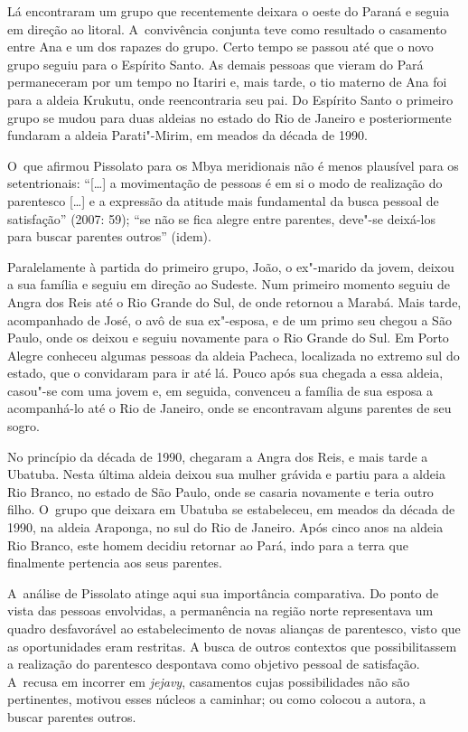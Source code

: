 Lá encontraram um grupo que recentemente deixara o oeste do Paraná e
seguia em direção ao litoral. A~convivência conjunta teve como
resultado o casamento entre Ana e um dos rapazes do grupo. Certo tempo
se passou até que o novo grupo seguiu para o Espírito Santo. As demais
pessoas que vieram do Pará permaneceram por um tempo no Itariri e, mais
tarde, o tio materno de Ana foi para a aldeia Krukutu, onde
reencontraria seu pai. Do Espírito Santo o primeiro grupo se mudou para
duas aldeias no estado do Rio de Janeiro e posteriormente fundaram a
aldeia Parati"-Mirim, em meados da década de 1990.

O~que afirmou Pissolato para os Mbya meridionais não é menos plausível
para os setentrionais: ``[\ldots{}] a movimentação de pessoas é em si o modo
de realização do parentesco [\ldots{}] e a expressão da atitude mais
fundamental da busca pessoal de satisfação'' (2007: 59); ``se não se fica
alegre entre parentes, deve"-se deixá-los para buscar parentes outros''
(idem).

Paralelamente à partida do primeiro grupo, João, o ex"-marido da jovem,
deixou a sua família e seguiu em direção ao Sudeste. Num primeiro
momento seguiu de Angra dos Reis até o Rio Grande do Sul, de onde
retornou a Marabá. Mais tarde, acompanhado de José, o avô de sua
ex"-esposa, e de um primo seu chegou a São Paulo, onde os deixou e
seguiu novamente para o Rio Grande do Sul. Em Porto Alegre conheceu
algumas pessoas da aldeia Pacheca, localizada no extremo sul do estado,
que o convidaram para ir até lá. Pouco após sua chegada a essa aldeia,
casou"-se com uma jovem e, em seguida, convenceu a família de sua esposa
a acompanhá-lo até o Rio de Janeiro, onde se encontravam alguns
parentes de seu sogro.

No princípio da década de 1990, chegaram a Angra dos Reis, e mais tarde
a Ubatuba. Nesta última aldeia deixou sua mulher grávida e partiu para
a aldeia Rio Branco, no estado de São Paulo, onde se casaria novamente
e teria outro filho. O~grupo que deixara em Ubatuba se estabeleceu, em
meados da década de 1990, na aldeia Araponga, no sul do Rio de Janeiro.
Após cinco anos na aldeia Rio Branco, este homem decidiu retornar ao
Pará, indo para a terra que finalmente pertencia aos seus parentes.

A~análise de Pissolato atinge aqui sua importância comparativa. Do ponto
de vista das pessoas envolvidas, a permanência na região norte
representava um quadro desfavorável ao estabelecimento de novas
alianças de parentesco, visto que as oportunidades eram restritas. A
busca de outros contextos que possibilitassem a realização do
parentesco despontava como objetivo pessoal de satisfação. A~recusa em
incorrer em \emph{jejavy}, casamentos cujas possibilidades não são
pertinentes, motivou esses núcleos a caminhar; ou como colocou a
autora, a buscar parentes outros. 

